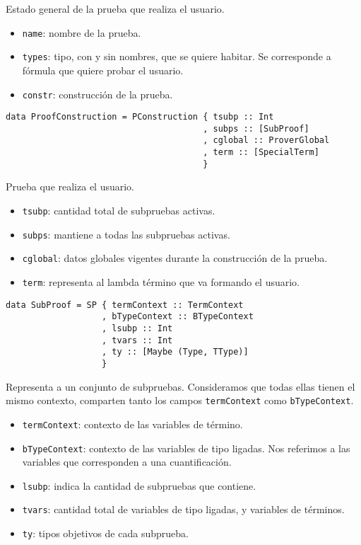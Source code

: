 \documentclass[a4paper,11pt]{article}
\begin{document}
Estado general de la prueba que realiza el usuario.
\begin{itemize}
  \item \texttt{name}: nombre de la prueba.
  \item \texttt{types}: tipo, con y sin nombres, que se quiere habitar. Se corresponde a fórmula que quiere probar el usuario.
  \item \texttt{constr}: construcción de la prueba.
\end{itemize}

\begin{verbatim}
data ProofConstruction = PConstruction { tsubp :: Int
                                       , subps :: [SubProof]
                                       , cglobal :: ProverGlobal
                                       , term :: [SpecialTerm]
                                       }
\end{verbatim}

Prueba que realiza el usuario.
\begin{itemize}
  \item \texttt{tsubp}: cantidad total de subpruebas activas.
  \item \texttt{subps}: mantiene a todas las subpruebas activas.
  \item \texttt{cglobal}: datos globales vigentes durante la construcción de la prueba.
  \item \texttt{term}: representa al lambda término que va formando el usuario.
\end{itemize}

\begin{verbatim}
data SubProof = SP { termContext :: TermContext
                   , bTypeContext :: BTypeContext
                   , lsubp :: Int
                   , tvars :: Int
                   , ty :: [Maybe (Type, TType)]
                   }
\end{verbatim}

Representa a un conjunto de subpruebas.
Consideramos que todas ellas tienen el mismo contexto, comparten tanto los campos \texttt{termContext} como \texttt{bTypeContext}.
\begin{itemize}
  \item \texttt{termContext}: contexto de las variables de término.
  \item \texttt{bTypeContext}: contexto de las variables de tipo ligadas. Nos referimos a las variables que corresponden a una cuantificación.
  \item \texttt{lsubp}: indica la cantidad de subpruebas que contiene.
  \item \texttt{tvars}: cantidad total de variables de tipo ligadas, y variables de términos.
  \item \texttt{ty}: tipos objetivos de cada subprueba.
\end{itemize}
\end{document}
